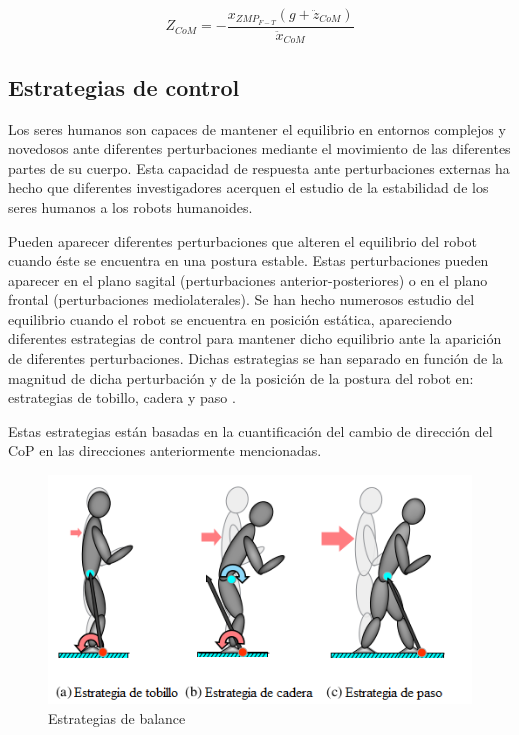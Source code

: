 \begin{equation}
Z_{CoM}=-\frac{x_{ZMP_{F-T}}(g+\ddot{z}_{CoM})}{\ddot{x}_{CoM}}
\label{ec432}
\end{equation}



\newpage

\subsection{Estrategias de control}

Los seres humanos son capaces de mantener el equilibrio en entornos complejos y novedosos ante diferentes perturbaciones mediante el movimiento de las diferentes partes de su cuerpo. Esta capacidad de respuesta ante perturbaciones externas ha hecho que diferentes investigadores acerquen el estudio de la estabilidad de los seres humanos a los robots humanoides.

Pueden aparecer diferentes perturbaciones que alteren el equilibrio del robot cuando éste se encuentra en una postura estable. Estas perturbaciones pueden aparecer en el plano sagital (perturbaciones anterior-posteriores) o en el plano frontal (perturbaciones mediolaterales). Se han hecho numerosos estudio del equilibrio cuando el robot se encuentra en posición estática, apareciendo diferentes estrategias de control para mantener dicho equilibrio ante la aparición de diferentes perturbaciones. Dichas estrategias se han separado en función de la magnitud de dicha perturbación y de la posición de la postura del robot en: estrategias de tobillo, cadera y paso \cite{ref17} \cite{ref18}.

Estas estrategias están basadas en la cuantificación del cambio de dirección del CoP en las direcciones anteriormente mencionadas.

\begin{figure}[H]
\centering
\includegraphics[scale=0.8]{imagenes/apartado_4/49_balance_strategies}
\caption{Estrategias de balance}
\label{figura49}
\end{figure}

